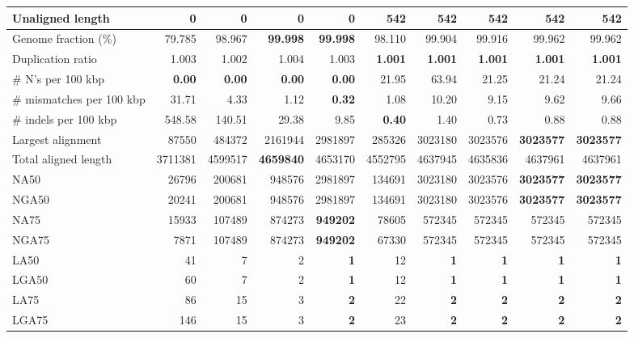 \documentclass[12pt,a4paper]{article}
\begin{document}
\begin{table}[ht]
\begin{center}
\begin{tabular}{|l*{9}{|r}|}
Unaligned length & {\bf 0} & {\bf 0} & {\bf 0} & {\bf 0} & 542 & 542 & 542 & 542 & 542 \\ \hline
Genome fraction (\%) & 79.785 & 98.967 & {\bf 99.998} & {\bf 99.998} & 98.110 & 99.904 & 99.916 & 99.962 & 99.962 \\ \hline
Duplication ratio & 1.003 & 1.002 & 1.004 & 1.003 & {\bf 1.001} & {\bf 1.001} & {\bf 1.001} & {\bf 1.001} & {\bf 1.001} \\ \hline
\# N's per 100 kbp & {\bf 0.00} & {\bf 0.00} & {\bf 0.00} & {\bf 0.00} & 21.95 & 63.94 & 21.25 & 21.24 & 21.24 \\ \hline
\# mismatches per 100 kbp & 31.71 & 4.33 & 1.12 & {\bf 0.32} & 1.08 & 10.20 & 9.15 & 9.62 & 9.66 \\ \hline
\# indels per 100 kbp & 548.58 & 140.51 & 29.38 & 9.85 & {\bf 0.40} & 1.40 & 0.73 & 0.88 & 0.88 \\ \hline
Largest alignment & 87550 & 484372 & 2161944 & 2981897 & 285326 & 3023180 & 3023576 & {\bf 3023577} & {\bf 3023577} \\ \hline
Total aligned length & 3711381 & 4599517 & {\bf 4659840} & 4653170 & 4552795 & 4637945 & 4635836 & 4637961 & 4637961 \\ \hline
NA50 & 26796 & 200681 & 948576 & 2981897 & 134691 & 3023180 & 3023576 & {\bf 3023577} & {\bf 3023577} \\ \hline
NGA50 & 20241 & 200681 & 948576 & 2981897 & 134691 & 3023180 & 3023576 & {\bf 3023577} & {\bf 3023577} \\ \hline
NA75 & 15933 & 107489 & 874273 & {\bf 949202} & 78605 & 572345 & 572345 & 572345 & 572345 \\ \hline
NGA75 & 7871 & 107489 & 874273 & {\bf 949202} & 67330 & 572345 & 572345 & 572345 & 572345 \\ \hline
LA50 & 41 & 7 & 2 & {\bf 1} & 12 & {\bf 1} & {\bf 1} & {\bf 1} & {\bf 1} \\ \hline
LGA50 & 60 & 7 & 2 & {\bf 1} & 12 & {\bf 1} & {\bf 1} & {\bf 1} & {\bf 1} \\ \hline
LA75 & 86 & 15 & 3 & {\bf 2} & 22 & {\bf 2} & {\bf 2} & {\bf 2} & {\bf 2} \\ \hline
LGA75 & 146 & 15 & 3 & {\bf 2} & 23 & {\bf 2} & {\bf 2} & {\bf 2} & {\bf 2} \\ \hline
\end{tabular}
\end{center}
\end{table}
\end{document}
